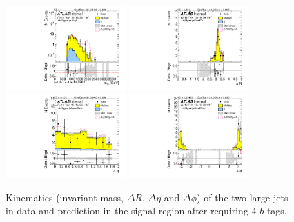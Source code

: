 \begin{figure}[htb!]
\begin{center}
\includegraphics[width=0.41\textwidth,angle=-90]{figures/boosted/Signal/b77_FourTag_Signal_mHH_l_1.pdf}
\includegraphics[width=0.41\textwidth,angle=-90]{figures/boosted/Signal/b77_FourTag_Signal_hCandDr.pdf}\\
\includegraphics[width=0.41\textwidth,angle=-90]{figures/boosted/Signal/b77_FourTag_Signal_hCandDeta.pdf}
\includegraphics[width=0.41\textwidth,angle=-90]{figures/boosted/Signal/b77_FourTag_Signal_hCandDphi.pdf}
  \caption{Kinematics (invariant mass, $\Delta R$, $\Delta \eta$ and $\Delta \phi$) of the two large-\R jets in data and prediction in the signal region after requiring 4 $b$-tags.  }
  \label{fig:boosted-4b-signal-ak10-system}
\end{center}
\end{figure}

\clearpage

